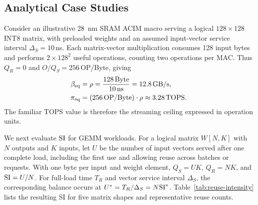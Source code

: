 \subsection{Analytical Case Studies}
Consider an illustrative 28~nm SRAM ACIM macro serving a logical $128\times128$ INT8 matrix, with preloaded weights and an assumed input-vector service interval $\Delta_S=10$\,ns. Each matrix-vector multiplication consumes 128 input bytes and performs $2\times128^2$ useful operations, counting two operations per MAC. Thus $Q_R=0$ and $O/Q_S=256$\,OP/Byte, giving
\begin{equation}
  \begin{aligned}
    \beta_{\mathrm{eq}}
      &=\rho=\frac{128\,\mathrm{Byte}}{10\,\mathrm{ns}}
        =12.8\,\mathrm{GB/s},\\
    \pi_{\mathrm{eq}}
      &=(256\,\mathrm{OP}/\mathrm{Byte})\cdot\rho
        \approx3.28\,\mathrm{TOPS}.
  \end{aligned}
  \label{eq:macro-example}
\end{equation}
The familiar TOPS value is therefore the streaming ceiling expressed in operation units.

We next evaluate $\mathrm{SI}$ for GEMM workloads. For a logical matrix $W[N,K]$ with $N$ outputs and $K$ inputs, let $U$ be the number of input vectors served after one complete load, including the first use and allowing reuse across batches or requests. With one byte per input and weight element, $Q_S=UK$, $Q_R=NK$, and $\mathrm{SI}=U/N$. For full-load time $T_R$ and vector service interval $\Delta_S$, the corresponding balance occurs at $U^*=T_R/\Delta_S=N\mathrm{SI}^*$. Table~\ref{tab:reuse-intensity} lists the resulting SI for five matrix shapes and representative reuse counts.
\paperplacetableone
